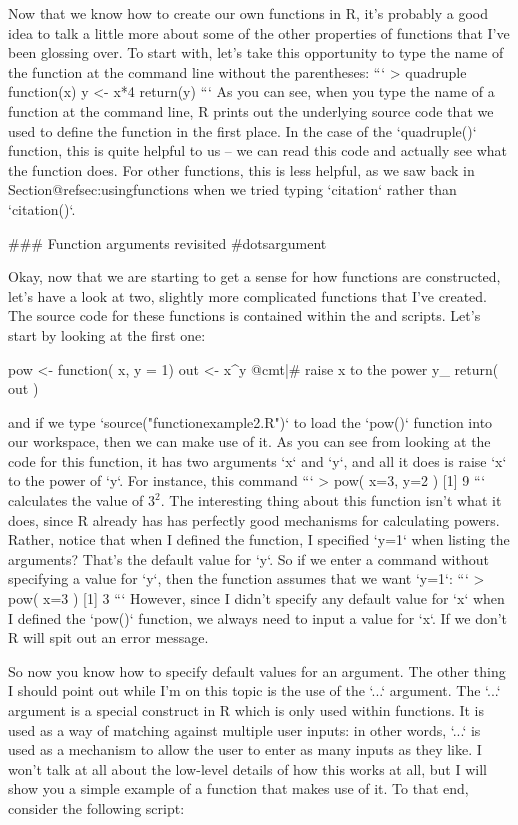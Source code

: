 Now that we know how to create our own functions in R, it's probably a good idea to talk a little more about some of the other properties of functions that I've been glossing over. To start with, let's take this opportunity to type the name of the function at the command line without the parentheses:
```
> quadruple
function(x) {
  y <- x*4
  return(y)
}
```
As you can see, when you type the name of a function at the command line, R prints out the underlying source code that we used to define the function in the first place. In the case of the `quadruple()` function, this is quite helpful to us -- we can read this code and actually see what the function does. For other functions, this is less helpful, as we saw back in Section@refsec:usingfunctions when we tried typing `citation` rather than `citation()`. 

### Function arguments revisited {#dotsargument}

Okay, now that we are starting to get a sense for how functions are constructed, let's have a look at two, slightly more complicated functions that I've created. The source code for these functions is contained within the  and  scripts. Let's start by looking at the first one:

\begin{script}
pow <- function( x, y = 1) {
  out <- x^y  @cmt|# raise x to the power y_
  return( out )
}
\end{script}
and if we type `source("functionexample2.R")` to load the `pow()` function into our workspace, then we can make use of it. As you can see from looking at the code for this function, it has two arguments `x` and `y`, and all it does is raise `x` to the power of `y`. For instance, this command
```
> pow( x=3, y=2 )
[1] 9
```
calculates the value of $3^2$. The interesting thing about this function isn't what it does, since R already has has perfectly good mechanisms for calculating powers. Rather, notice that when I defined the function, I specified `y=1` when listing the arguments? That's the default value for `y`. So if we enter a command without specifying a value for `y`, then the function assumes that we want `y=1`:
```
> pow( x=3 )
[1] 3
```
However, since I didn't specify any default value for `x` when I defined the `pow()` function, we always need to input a value for `x`. If we don't R will spit out an error message.

So now you know how to specify default values for an argument. The other thing I should point out while I'm on this topic is the use of the `...` argument. The `...` argument is a special construct in R which is only used within functions. It is used as a way of matching against multiple user inputs: in other words, `...` is used as a mechanism to allow the user to enter as many inputs as they like. I won't talk at all about the low-level details of how this works at all, but I will show you a simple example of a function that makes use of it. To that end, consider the following script:

